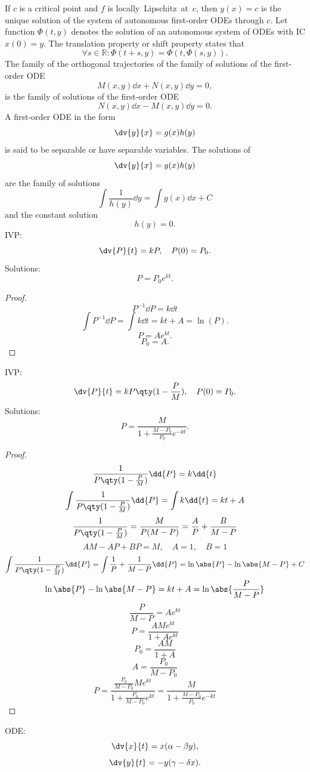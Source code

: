 \documentclass[a4paper,12pt]{report}
\begin{document}
If $c$ is a critical point and $f$ is locally Lipschitz at $c$, then $y(x)=c$ is the unique solution of the system of autonomous first-order ODEs through $c$.
Let function $\Phi(t,y)$ denotes the solution of an autonomous system of ODEs with IC $x(0)=y$. The translation property or shift property states that
\[\forall s\in\mathbb{R}\colon\Phi(t+s,y)=\Phi(t,\Phi(s,y)).\]
The family of the orthogonal trajectories of the family of solutions of the first-order ODE
\[M(x,y)\dd{x}+N(x,y)\dd{y}=0,\]
is the family of solutions of the first-order ODE
\[N(x,y)\dd{x}-M(x,y)\dd{y}=0.\]
A first-order ODE in the form
\[\dv{y}{x}=g(x)h(y)\]
is said to be separable or have separable variables.
The solutions of
\[\dv{y}{x}=g(x)h(y)\]
are the family of solutions
\[\int\frac{1}{h(y)}\dd{y}=\int g(x)\dd{x}+C\]
and the constant solution
\[h(y)=0.\]
IVP:
\[\dv{P}{t}=kP,\quad P(0)=P_0.\]
Solutions:
\[P=P_0e^{kt}.\]
\begin{proof}
\[P^{-1}\dd{P}=k\dd{t}\]
\[\int P^{-1}\dd{P}=\int k\dd{t}=kt+A=\ln(P).\]
\[P=Ae^{kt}.\]
\[P_0=A.\]
\end{proof}
IVP:
\[\dv{P}{t}=kP\qty(1-\frac{P}{M}),\quad P(0)=P_0.\]
Solutions:
\[P=\frac{M}{1+\frac{M-P_0}{P_0}e^{-kt}}.\]
\begin{proof}
\[\frac{1}{P\qty(1-\frac{P}{M})}\dd{P}=k\dd{t}\]
\[\int\frac{1}{P\qty(1-\frac{P}{M})}\dd{P}=\int k\dd{t}=kt+A\]
\[\frac{1}{P\qty(1-\frac{P}{M})}=\frac{M}{P(M-P)}=\frac{A}{P}+\frac{B}{M-P}\]
\[AM-AP+BP=M,\quad A=1,\quad B=1\]
\[\int\frac{1}{P\qty(1-\frac{P}{M})}\dd{P}=\int\frac{1}{P}+\frac{1}{M-P}\dd{P}=\ln\abs{P}-\ln\abs{M-P}+C\]
\[\ln\abs{P}-\ln\abs{M-P}=kt+A=\ln\abs{\frac{P}{M-P}}\]
\[\frac{P}{M-P}=Ae^{kt}\]
\[P=\frac{AMe^{kt}}{1+Ae^{kt}}\]
\[P_0=\frac{AM}{1+A}\]
\[A=\frac{P_0}{M-P_0}\]
\[P=\frac{\frac{P_0}{M-P_0}Me^{kt}}{1+\frac{P_0}{M-P_0}e^{kt}}=\frac{M}{1+\frac{M-P_0}{P_0}e^{-kt}}\]
\end{proof}
ODE:
\[\dv{x}{t}=x(\alpha-\beta y),\]
\[\dv{y}{t}=-y(\gamma-\delta x).\]
\end{document}
